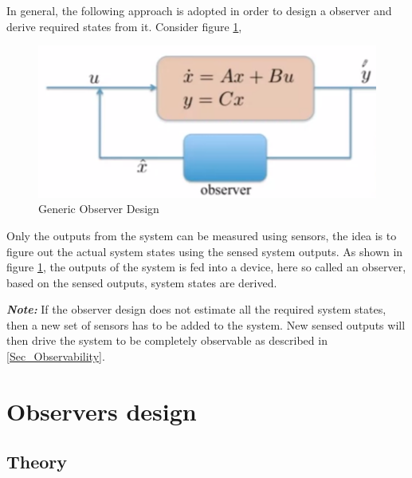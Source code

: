 In general, the following approach is adopted in order to design a observer and derive required states from it. Consider figure \ref{Fig_GenericObserverDeisgn},
\begin{figure}[h!]
	\centering
	\includegraphics[width=0.5\linewidth]{Bilder/SS4.png}
	\caption{Generic Observer Design}
	\label{Fig_GenericObserverDeisgn}
\end{figure}
Only the outputs from the system can be measured using sensors, the idea is to figure out the actual system states using the sensed system outputs. As shown in figure \ref{Fig_GenericObserverDeisgn}, the outputs of the system is fed into a device, here so called an observer, based on the sensed outputs, system states are derived.

\textbf{\textit{Note: }}If the observer design does not estimate all the required system states, then a new set of sensors has to be added to the system. New sensed outputs will then drive the system to be completely observable as described in \ref{Sec_Observability}.

\section{Observers design}

\subsection{Theory}

